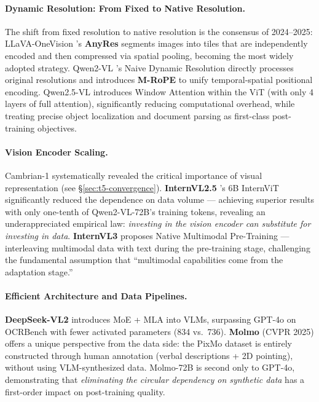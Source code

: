 \paragraph{Dynamic Resolution: From Fixed to Native Resolution.}
The shift from fixed resolution to native resolution is the consensus of 2024--2025:
LLaVA-OneVision \cite{li2024llava-onevision}'s \textbf{AnyRes}
segments images into tiles that are independently encoded and then compressed via spatial pooling,
becoming the most widely adopted strategy.
Qwen2-VL \cite{wang2024qwen2vl}'s Naive Dynamic Resolution
directly processes original resolutions and introduces \textbf{M-RoPE}
to unify temporal-spatial positional encoding.
Qwen2.5-VL \cite{bai2025qwen25vl} introduces Window Attention within the ViT
(with only 4 layers of full attention), significantly reducing computational overhead,
while treating precise object localization and document parsing as first-class post-training objectives.

\paragraph{Vision Encoder Scaling.}
Cambrian-1 \cite{tong2024cambrian} systematically revealed the critical importance of visual representation
(see \S\ref{sec:t5-convergence}).
\textbf{InternVL2.5} \cite{chen2024internvl25}'s 6B InternViT significantly reduced the dependence on data volume ---
achieving superior results with only one-tenth of Qwen2-VL-72B's training tokens,
revealing an underappreciated empirical law:
\textit{investing in the vision encoder can substitute for investing in data}.
\textbf{InternVL3} \cite{zhu2025internvl3} proposes Native Multimodal Pre-Training ---
interleaving multimodal data with text during the pre-training stage,
challenging the fundamental assumption that ``multimodal capabilities come from the adaptation stage.''

\paragraph{Efficient Architecture and Data Pipelines.}
\textbf{DeepSeek-VL2} \cite{wu2024deepseekvl2} introduces MoE + MLA into VLMs,
surpassing GPT-4o on OCRBench with fewer activated parameters (834 vs.\ 736).
\textbf{Molmo} \cite{deitke2024molmo} (CVPR 2025) offers a unique perspective from the data side:
the PixMo dataset is entirely constructed through human annotation (verbal descriptions + 2D pointing), without using VLM-synthesized data.
Molmo-72B is second only to GPT-4o, demonstrating that
\textit{eliminating the circular dependency on synthetic data} has a first-order impact on post-training quality.

